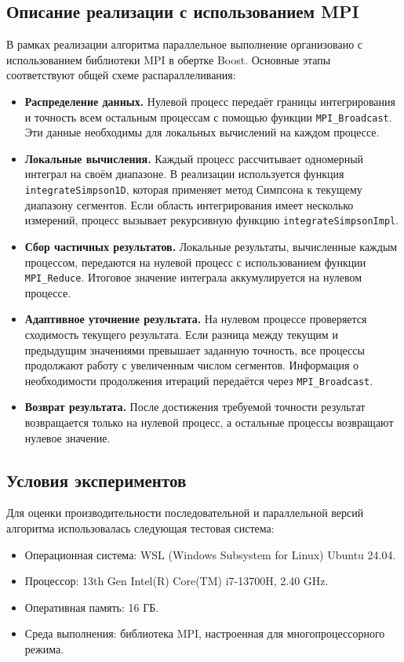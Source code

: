 \documentclass[12pt]{article}
\begin{document}
\subsection*{Описание реализации с использованием MPI}
В рамках реализации алгоритма параллельное выполнение организовано с использованием библиотеки MPI в обертке Boost. Основные этапы соответствуют общей схеме распараллеливания:

\begin{itemize}
    \item \textbf{Распределение данных.}
          Нулевой процесс передаёт границы интегрирования и точность всем остальным процессам с помощью функции \texttt{MPI\_Broadcast}. Эти данные необходимы для локальных вычислений на каждом процессе.

    \item \textbf{Локальные вычисления.}
          Каждый процесс рассчитывает одномерный интеграл на своём диапазоне. В реализации используется функция \texttt{integrateSimpson1D}, которая применяет метод Симпсона к текущему диапазону сегментов. Если область интегрирования имеет несколько измерений, процесс вызывает рекурсивную функцию \texttt{integrateSimpsonImpl}.

    \item \textbf{Сбор частичных результатов.}
          Локальные результаты, вычисленные каждым процессом, передаются на нулевой процесс с использованием функции \texttt{MPI\_Reduce}. Итоговое значение интеграла аккумулируется на нулевом процессе.

    \item \textbf{Адаптивное уточнение результата.}
          На нулевом процессе проверяется сходимость текущего результата. Если разница между текущим и предыдущим значениями превышает заданную точность, все процессы продолжают работу с увеличенным числом сегментов. Информация о необходимости продолжения итераций передаётся через \texttt{MPI\_Broadcast}.

    \item \textbf{Возврат результата.}
          После достижения требуемой точности результат возвращается только на нулевой процесс, а остальные процессы возвращают нулевое значение.
\end{itemize}

\subsection*{Условия экспериментов}
Для оценки производительности последовательной и параллельной версий алгоритма использовалась следующая тестовая система:
\begin{itemize}
    \item Операционная система: WSL (Windows Subsystem for Linux) Ubuntu 24.04.
    \item Процессор: 13th Gen Intel(R) Core(TM) i7-13700H, 2.40 GHz.
    \item Оперативная память: 16 ГБ.
    \item Среда выполнения: библиотека MPI, настроенная для многопроцессорного режима.
\end{itemize}
\end{document}
